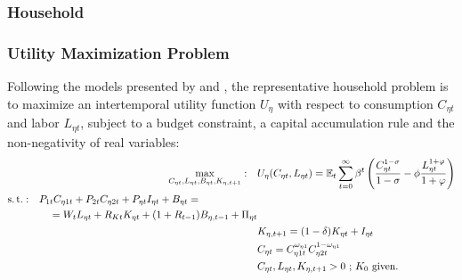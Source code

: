 \documentclass[../thesis.tex]{subfiles}
\begin{document}
\newpage




\subsubsection{Household}

\subsubsection*{Utility Maximization Problem}

Following the models presented by \textcite{costa_junior_understanding_2016} and \textcite{solis-garcia_ucb_2022}, the representative household problem is to maximize an intertemporal utility function $U_{\eta}$ with respect to consumption $C_{\eta t}$ and labor $L_{\eta t}$, subject to a budget constraint, a capital accumulation rule and the non-negativity of real variables:
\begin{align}
	\max_{C_{\eta t}, L_{\eta t}, B_{\eta t}, K_{\eta, t+1}}: \quad & U_{\eta}(C_{\eta t},L_{\eta t}) = {\mathbb{E}_{t}} \sum_{t=0}^{\infty} \beta^t \left(\frac{C_{\eta t}^{1-\sigma}}{1-\sigma} - \phi \frac{L_{\eta t}^{1+\varphi}}{1+\varphi} \right) \label{eq:reg-utility-function-0} 
	\\
	\begin{split}
		\operatorname{s.t.}: \quad & P_{1 t} C_{\eta 1 t} + P_{2 t} C_{\eta 2 t} + P_{\eta t} I_{\eta t} + B_{\eta t} = \\ & \quad = W_t L_{\eta t} + R_{Kt} K_{\eta t} + (1 + R_{t-1}) B_{\eta,t-1} + \Pi_{\eta t}
	\end{split} \label{eq:reg-budget-constraint} \\
	\quad & K_{\eta, t+1} = (1-\delta)K_{\eta t} + I_{\eta t} \label{eq:reg-law-of-motion-for-capital} \\
	\quad & C_{\eta t} = C_{\eta 1 t}^{\omega_{\eta 1}} C_{\eta 2 t}^{1-\omega_{\eta 1}} \label{eq:reg-consumption-aggregation} \\
	\quad & C_{\eta t}, L_{\eta t}, K_{\eta, t+1} > 0 \text{ ; $K_0$ given.} \nonumber
\end{align}
\end{document}
